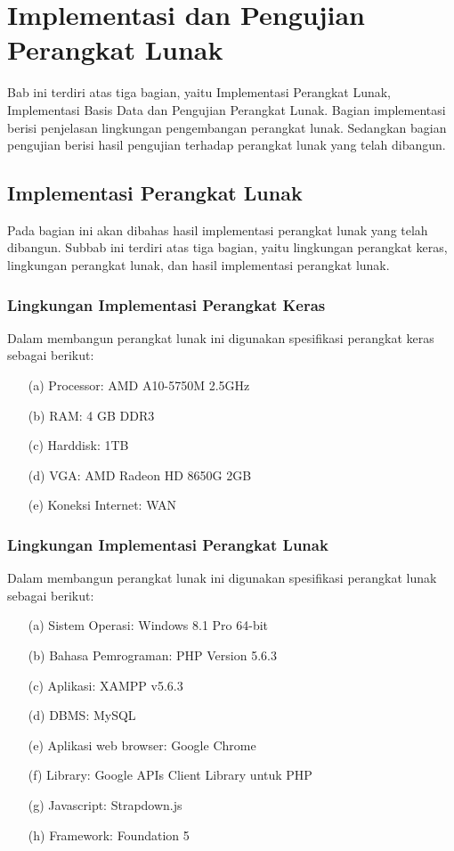 \chapter{Implementasi dan Pengujian Perangkat Lunak}
\label{chap:implementasidanpengujian}

Bab ini terdiri atas tiga bagian, yaitu Implementasi Perangkat Lunak,
Implementasi Basis Data dan Pengujian Perangkat Lunak. Bagian implementasi
berisi penjelasan lingkungan pengembangan perangkat lunak. Sedangkan bagian
pengujian berisi hasil pengujian terhadap perangkat lunak yang telah dibangun.

\section{Implementasi Perangkat Lunak}
\label{sec:implementasiperangkatlunak}

Pada bagian ini akan dibahas hasil implementasi perangkat lunak yang telah
dibangun. Subbab ini terdiri atas tiga bagian, yaitu lingkungan perangkat keras,
lingkungan perangkat lunak, dan hasil implementasi perangkat lunak.

\subsection{Lingkungan Implementasi Perangkat Keras}
\label{sec:lingkunganimplementasiperangkatkeras}

Dalam membangun perangkat lunak ini digunakan spesifikasi perangkat keras
sebagai berikut:

\begin{enumerate}
\item[(a)] Processor: AMD A10-5750M 2.5GHz
\item[(b)] RAM: 4 GB DDR3
\item[(c)] Harddisk: 1TB
\item[(d)] VGA: AMD Radeon HD 8650G 2GB
\item[(e)] Koneksi Internet: WAN
\end{enumerate}

\subsection{Lingkungan Implementasi Perangkat Lunak}
\label{sec:lingkunganimplementasiperangkatlunak}

Dalam membangun perangkat lunak ini digunakan spesifikasi perangkat lunak
sebagai berikut:

\begin{enumerate}
\item[(a)] Sistem Operasi: Windows 8.1 Pro 64-bit
\item[(b)] Bahasa Pemrograman: PHP Version 5.6.3
\item[(c)] Aplikasi: XAMPP v5.6.3
\item[(d)] DBMS: MySQL
\item[(e)] Aplikasi web browser: Google Chrome
\item[(f)] Library: Google APIs Client Library untuk PHP
\item[(g)] Javascript: Strapdown.js
\item[(h)] Framework: Foundation 5
\end{enumerate}

